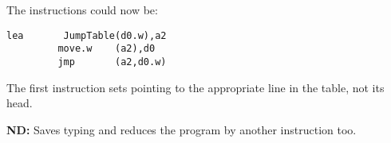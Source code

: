 The instructions could now be:

\begin{lstlisting}[firstnumber=1,caption={Improved Jump Table Code}]
         lea       JumpTable(d0.w),a2
         move.w    (a2),d0
         jmp       (a2,d0.w)
\end{lstlisting}

The first instruction sets  pointing to the appropriate line in the table, not its head.

\textbf{ND: }Saves typing and reduces the program by another instruction too. 